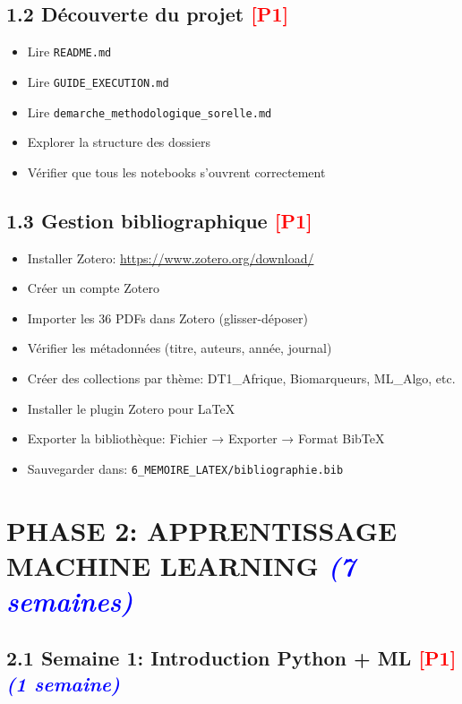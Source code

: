 \documentclass[a4paper,11pt]{article}
\newcommand{\checkboxdone}{\large$\boxtimes$}
\newcommand{\priorite}[1]{\textcolor{red}{\textbf{[#1]}}}
\newcommand{\duree}[1]{\textcolor{blue}{\textit{(#1)}}}
\begin{document}
\subsection*{1.2 Découverte du projet \priorite{P1}}

\begin{itemize}[label=\checkboxdone]
    \item Lire \texttt{README.md}
    \item Lire \texttt{GUIDE\_EXECUTION.md}
    \item Lire \texttt{demarche\_methodologique\_sorelle.md}
    \item Explorer la structure des dossiers
    \item Vérifier que tous les notebooks s'ouvrent correctement
\end{itemize}

\subsection*{1.3 Gestion bibliographique \priorite{P1}}

\begin{itemize}[label=\checkboxdone]
    \item Installer Zotero: \url{https://www.zotero.org/download/}
    \item Créer un compte Zotero
    \item Importer les 36 PDFs dans Zotero (glisser-déposer)
    \item Vérifier les métadonnées (titre, auteurs, année, journal)
    \item Créer des collections par thème: DT1\_Afrique, Biomarqueurs, ML\_Algo, etc.
    \item Installer le plugin Zotero pour LaTeX
    \item Exporter la bibliothèque: Fichier → Exporter → Format BibTeX
    \item Sauvegarder dans: \texttt{6\_MEMOIRE\_LATEX/bibliographie.bib}
\end{itemize}

\newpage

\section*{PHASE 2: APPRENTISSAGE MACHINE LEARNING \duree{7 semaines}}

\subsection*{2.1 Semaine 1: Introduction Python + ML \priorite{P1} \duree{1 semaine}}
\end{document}
